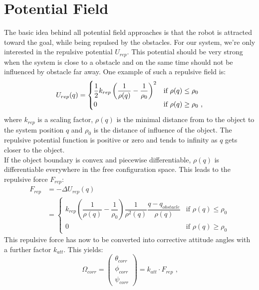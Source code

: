 \section{Potential Field}
\label{sec:potential field}
The basic idea behind all potential field approaches is that the robot is attracted toward the goal, while being repulsed by the obstacles. For our system, we're only interested in the repulsive potential $U_{rep}$. This potential should be very strong when the system is close to a obstacle and on the same time should not be influenced by obstacle far away. One example of such a repulsive field is:
\begin{equation}
\label{eq:pot field}
\centering
U_{rep}(q)=\begin{cases}
\dfrac{1}{2}k_{rep}\left(\dfrac{1}{\rho (q)}-\dfrac{1}{\rho_0}\right)^2 & \text{if } \rho(q)\leq\rho_0 \\
0 & \text{if } \rho(q)\geq\rho_0 \text{ ,}
\end{cases}
\end{equation}
where $k_{rep}$ is a scaling factor, $\rho(q)$ is the minimal distance from to the object to the system position $q$ and $\rho_0$ is the distance of influence of the object. The repulsive potential function is positive or zero and tends to infinity as $q$ gets closer to the object.\\
If the object boundary is convex and piecewise differentiable, $\rho(q)$ is differentiable everywhere in the free configuration space. This leads to the repulsive force $F_{rep}$:
\begin{equation}
\label{eq:force}
\begin{split}
F_{rep} &=-\Delta U_{rep}(q)\\
&=	\begin{cases}
k_{rep}\left(\dfrac{1}{\rho(q)}-\dfrac{1}{\rho_0}\right)\dfrac{1}{\rho^2(q)}\dfrac{q-q_{obstacle}}{\rho(q)} & \text{if }\rho(q)\leq\rho_0\\
0 & \text{if }\rho(q)\geq\rho_0
\end{cases}
\end{split}
\end{equation}
This repulsive force has now to be converted into corrective attitude angles with a further factor $k_{att}$. This yields: 
\begin{equation}
	\label{eq:angles}
	\Omega_{corr} =\begin{pmatrix}
	\theta_{corr} \\ \phi_{corr} \\ \psi_{corr}
	\end{pmatrix} = k_{att}\cdot F_{rep} \text{ ,}
\end{equation}
